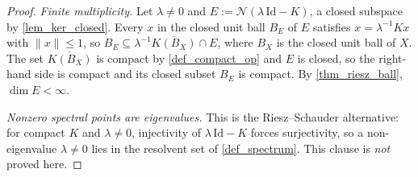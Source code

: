 \documentclass[a4paper]{report}
\theoremstyle{plain}
\theoremstyle{definition}
\theoremstyle{remark}
\begin{document}
\begin{proof}
  \emph{Finite multiplicity.}  Let $\lambda \ne 0$ and
  $E := \mathcal{N}(\lambda\,\mathrm{Id}-K)$, a closed subspace by \cref{lem_ker_closed}.
  Every $x$ in the closed unit ball $B_E$ of $E$ satisfies $x = \lambda^{-1}Kx$ with
  $\|x\| \le 1$, so $B_E \subseteq \lambda^{-1}\overline{K(B_X)} \cap E$, where $B_X$ is
  the closed unit ball of $X$.  The set $\overline{K(B_X)}$ is compact by
  \cref{def_compact_op} and $E$ is closed, so the right-hand side is compact and its closed
  subset $B_E$ is compact.  By \cref{thm_riesz_ball}, $\dim E < \infty$.

  \emph{Nonzero spectral points are eigenvalues.}  This is the Riesz--Schauder
  alternative: for compact $K$ and $\lambda \ne 0$, injectivity of
  $\lambda\,\mathrm{Id}-K$ forces surjectivity, so a non-eigenvalue $\lambda \ne 0$ lies in
  the resolvent set of \cref{def_spectrum}.  This clause is \emph{not} proved here.


\end{proof}
\end{document}
